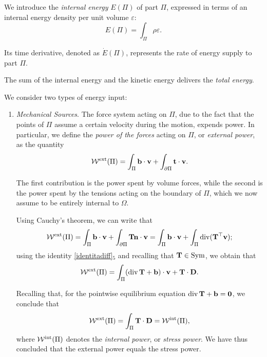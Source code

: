 We introduce the \textit{internal energy} \( E(\Pi) \) of part \( \Pi \), expressed in terms of an internal energy density per unit volume \( \varepsilon \):
\begin{equation}
	E(\Pi) = \int_{\Pi}\rho \varepsilon.
\end{equation}

Its time derivative, denoted as \( \dot{E}(\Pi) \), represents the rate of energy supply to part \( \Pi \).

The sum of the internal energy and the kinetic energy delivers the \textit{total energy}.

We consider two types of energy input:

\begin{enumerate}
	\item \textit{Mechanical Sources}. The force system acting on \( \Pi \), due to the fact that the points of \( \Pi \) assume a certain velocity during the motion, expends power. In particular, we define the \textit{power of the forces} acting on \( \Pi \), or \textit{external power}, as the quantity
	\begin{equation}\label{Wext}
		\mathcal{W}^{\rm ext}(\Pi)= \int_{\Pi} \mathbf{b} \cdot \mathbf{v} + \int_{\partial \Pi} \mathbf{t}\cdot \mathbf{v}.
	\end{equation}
	
	The first contribution is the power spent by volume forces, while the second is the power spent by the tensions acting on the boundary of \( \Pi \), which we now assume to be entirely internal to \( \Omega \).
	
	Using Cauchy's theorem, we can write that 
	\begin{equation}
		\mathcal{W}^{\rm ext}(\Pi)=	\int_{\Pi} \mathbf{b} \cdot \mathbf{v} + \int_{\partial \Pi} \mathbf{T} \mathbf{n}\cdot \mathbf{v} = \int_{\Pi} \mathbf{b} \cdot \mathbf{v} + \int_{\Pi} \operatorname{div}(\mathbf{T}^\top\mathbf{v});
	\end{equation}
	using the identity \eqref{identitadiff}$_5$ and recalling that \( \mathbf{T} \in \operatorname{Sym} \), we obtain that 
	\begin{equation}
		\mathcal{W}^{\rm ext}(\Pi)	= \int_{\Pi} (\operatorname{div}\mathbf{T}+\mathbf{b}) \cdot \mathbf{v} +  \mathbf{T} \cdot \mathbf{D}.
	\end{equation}
	
	 Recalling that, for the pointwise equilibrium equation \( \operatorname{div}\mathbf{T}+\mathbf{b}=\mathbf{0} \), we conclude that
	\begin{equation}
		\mathcal{W}^{\rm ext}(\Pi)= \int_{\Pi}  \mathbf{T} \cdot \mathbf{D}=	\mathcal{W}^{\rm int}(\Pi),
	\end{equation}
	where \( \mathcal{W}^{\rm int}(\Pi) \) denotes the \textit{internal power}, or \textit{stress power}. We have thus concluded that the external power equals the stress power.
	

\end{enumerate}
